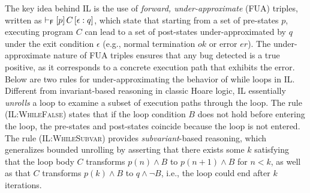 The key idea behind IL is the use of \emph{forward, under-approximate} (FUA) triples, written as $\vdash_{\mathsf{F}}\left[p\right]C\left[\epsilon : q\right]$, which state that starting from a set of pre-states $p$, executing program $C$ can lead to a set of post-states under-approximated by $q$ under the exit condition $\epsilon$ (e.g., normal termination $ok$ or error $er$).
%
The under-approximate nature of FUA triples ensures that any bug detected is a true positive, as it corresponds to a concrete execution path that exhibits the error.
%
Below are two rules for under-approximating the behavior of while loops in IL.
%
Different from invariant-based reasoning in classic Hoare logic, IL essentially \emph{unrolls} a loop to examine a subset of execution paths through the loop.
%
The rule \textsc{(IL:WhileFalse)} states that if the loop condition $B$ does not hold before entering the loop, the pre-states and post-states coincide because the loop is not entered.
%
The rule \textsc{(IL:WhileSubvar)} provides \emph{subvariant}-based reasoning, which generalizes bounded unrolling by asserting that there exists some $k$ satisfying that the loop body $C$ transforms $p(n) \wedge B$ to $p(n+1) \wedge B$ for $n<k$, as well as that $C$ transforms $p(k) \wedge B$ to $q \wedge \neg B$, i.e., the loop could end after $k$ iterations.
%

